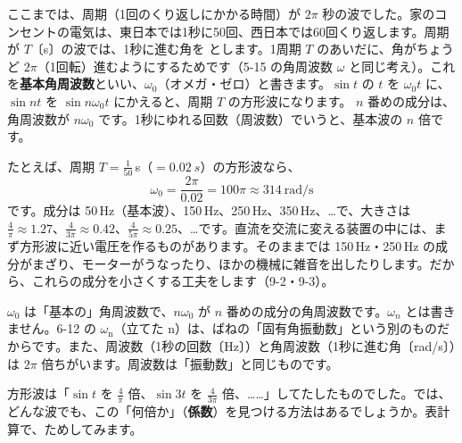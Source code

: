 
\label{bk:9-1:shuki}ここまでは、周期（1回のくり返しにかかる時間）が $2\pi$ 秒の波でした。家のコンセントの電気は、東日本では1秒に50回、西日本では60回くり返します。周期が $T$〔s〕の波では、1秒に進む角を
とします。1周期 $T$ のあいだに、角がちょうど $2\pi$（1回転）進むようにするためです（5-15 の角周波数 $\omega$ と同じ考え）。これを\textbf{基本角周波数}といい、$\omega_0$（オメガ・ゼロ）と書きます。$\sin t$ の $t$ を $\omega_0t$ に、$\sin nt$ を $\sin n\omega_0t$ にかえると、周期 $T$ の方形波になります。
$n$ 番めの成分は、角周波数が $n\omega_0$ です。1秒にゆれる回数（周波数）でいうと、基本波の $n$ 倍です。

たとえば、周期 $T=\frac{1}{50}$\,s（$=\qty{0.02}{s}$）の方形波なら、
\[ \omega_0=\frac{2\pi}{0.02}=100\pi\approx314\ \text{rad/s} \]
です。成分は 50\,Hz（基本波）、150\,Hz、250\,Hz、350\,Hz、…で、大きさは $\frac{4}{\pi}\approx1.27$、$\frac{4}{3\pi}\approx0.42$、$\frac{4}{5\pi}\approx0.25$、…です。直流を交流に変える装置の中には、まず方形波に近い電圧を作るものがあります。そのままでは 150\,Hz・250\,Hz の成分がまざり、モーターがうなったり、ほかの機械に雑音を出したりします。だから、これらの成分を小さくする工夫をします（9-2・9-3）。

\begin{seikaku}
$\omega_0$ は「基本の」角周波数で、$n\omega_0$ が $n$ 番めの成分の角周波数です。$\omega_n$ とは書きません。6-12 の $\omega_{\mathrm n}$（立てた n）は、ばねの「固有角振動数」という別のものだからです。また、周波数（1秒の回数〔Hz〕）と角周波数（1秒に進む角〔rad/s〕）は $2\pi$ 倍ちがいます。周波数は「振動数」と同じものです。
\end{seikaku}


\label{bk:9-1:kakete}方形波は「$\sin t$ を $\frac{4}{\pi}$ 倍、$\sin3t$ を $\frac{4}{3\pi}$ 倍、……」してたしたものでした。では、どんな波でも、この「何倍か」（\textbf{係数}）を見つける方法はあるでしょうか。表計算で、ためしてみます。

